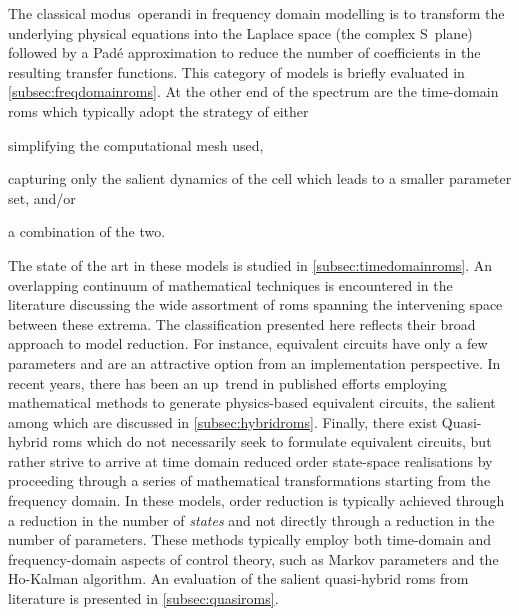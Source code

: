The classical \mbox{modus operandi} in frequency domain modelling is to
transform the underlying physical equations into the Laplace space (the complex
S~plane) followed by a Padé approximation to reduce the number of coefficients
in the resulting transfer functions. This category of models is briefly
evaluated in \cref{subsec:freqdomainroms}. At the other end of the spectrum are
the time-domain \glspl{rom} which typically adopt the strategy of either
\begin{enumerate*}[label=\itshape\alph*\upshape)]
    \item simplifying the computational mesh used,
    \item capturing only the salient dynamics of the cell which leads to a smaller parameter set,
        and/or
    \item a combination of the two.
\end{enumerate*}
The state of the art in these models is studied in \cref{subsec:timedomainroms}.
An overlapping continuum of mathematical techniques is encountered in the
literature discussing the wide assortment of \glspl{rom} spanning the
intervening space between these extrema. The classification presented here
reflects their broad approach to model reduction. For instance, equivalent
circuits have only a few parameters and are an attractive option from an
implementation perspective. In recent years, there has been an up~trend in
published efforts employing mathematical methods to generate physics-based
equivalent circuits, the salient among which are discussed in
\cref{subsec:hybridroms}. Finally, there exist Quasi-hybrid \glspl{rom} which do
not necessarily seek to formulate equivalent circuits, but rather strive to
arrive at  time domain reduced order state-space realisations by proceeding
through a series of mathematical transformations starting from the frequency
domain. In these models, order reduction is typically achieved through a
reduction in the number of \emph{states} and not directly through a reduction in
the number of parameters. These methods typically  employ both time-domain and
frequency-domain aspects of control theory, such as Markov parameters and the
Ho-Kalman algorithm. An evaluation of the salient quasi-hybrid \glspl{rom} from
literature is presented in \cref{subsec:quasiroms}.


